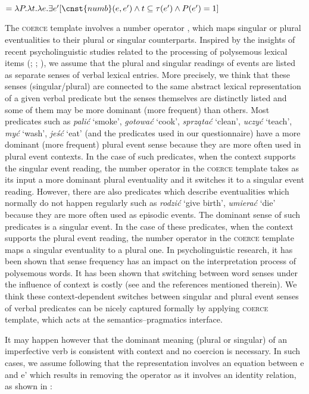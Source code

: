 \documentclass[output=paper]{langscibook}
\begin{document}
\ea {} $= \lambda P. \lambda t.\lambda e. \exists e' [\cnst{numb} (e, e') \wedge t \subseteq \tau(e') \wedge P(e')=1]$\label{jan-bla:fansb:kb:ex30}
\z 

\noindent The \textsc{coerce} template involves a number operator , which maps singular or plural eventualities to their plural or singular counterparts. Inspired by the insights of recent psycholinguistic studies related to the processing of polysemous lexical items (\citealt{KleinandMurphy2002}; \citealt{PylkkänenLlinásandMurphy2006}; \citealt{Frisson2015}), we assume that the plural and singular readings of events are listed as separate senses of verbal lexical entries. More precisely, we think that these senses (singular/plural) are connected to the same abstract lexical representation of a given verbal predicate but the senses themselves are distinctly listed and some of them may be more dominant (more frequent) than others.  Most predicates such as \textit{palić} ‘smoke’, \textit{gotować} ‘cook’, \textit{sprzątać} ‘clean’, \textit{uczyć} ‘teach’, \textit{myć} ‘wash’, \textit{jeść} ‘eat’ (and the predicates used in our questionnaire) have a more dominant (more frequent) plural event sense because they are more often used in plural event contexts. In the case of such predicates, when the context supports the singular event reading, the number operator in the \textsc{coerce} template takes as its input a more dominant plural eventuality and it switches it to a singular event reading. However, there are also predicates which describe eventualities which normally do not happen regularly such as \textit{rodzić} ‘give birth’, \textit{umierać} ‘die’ because they are more often used as episodic events. The dominant sense of such predicates is a singular event. In the case of these predicates, when the context supports the plural event reading, the number operator in the \textsc{coerce} template maps a singular eventuality to a plural one. In psycholinguistic research, it has been shown that sense frequency has an impact on the interpretation process of polysemous words. It has been shown that switching between word senses under the influence of context is costly (see \citealt{Frisson2015} and the references mentioned therein). We think these context-dependent switches between singular and plural event senses of verbal predicates can be nicely captured formally by applying  \textsc{coerce} template, which acts at the semantics--pragmatics interface.

It may happen however that the dominant meaning (plural or singular) of an imperfective verb is consistent with context and no coercion is necessary. In such cases, we assume following \citet{Dolling2014} that the representation involves an equation between e and e’ which results in removing the  operator as it involves an identity relation, as shown in :
\end{document}
